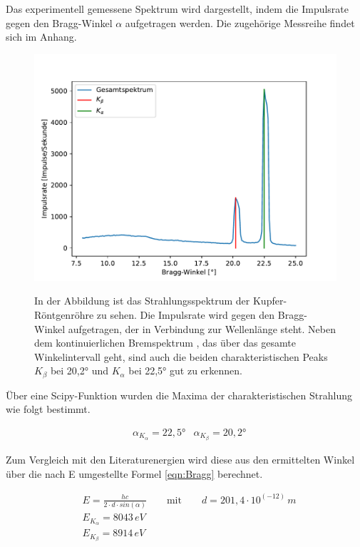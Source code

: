 \documentclass[titlepage = firstcover]{scrartcl}
\begin{document}
        \noindent
        Das experimentell gemessene Spektrum wird dargestellt, indem die Impulsrate gegen den Bragg-Winkel $\alpha$ aufgetragen werden. Die zugehörige 
        Messreihe findet sich im Anhang.
        
        \FloatBarrier
        \begin{figure}[h]
            \centering
            \caption{In der Abbildung ist das Strahlungsspektrum der Kupfer-Röntgenröhre zu sehen. Die Impulsrate wird gegen den Bragg-Winkel aufgetragen, der in Verbindung zur Wellenlänge steht. Neben dem kontinuierlichen Bremspektrum , das über das gesamte Winkelintervall geht, sind auch die beiden charakteristischen Peaks $K_{\beta}$ bei 20,2° und $K_{\alpha}$ bei 22,5° gut zu erkennen.}
            \includegraphics[width = 0.9\linewidth]{Spektrum_Cu.pdf}
            \label{fig:Spektrum}
        \end{figure}
        \FloatBarrier
        \noindent
        Über eine Scipy-Funktion wurden die Maxima der charakteristischen Strahlung wie folgt bestimmt.

        \begin{align}
            &\alpha_{K_{\alpha}} = 22,5°
            &\alpha_{K_{\beta}}  = 20,2°
        \end{align}

        \noindent
        Zum Vergleich mit den Literaturenergien wird diese aus den ermittelten Winkel über die nach E umgestellte Formel \ref{eqn:Bragg} berechnet.

        \begin{align}
            &E = \frac{hc}{2 \cdot d \cdot sin(\alpha)} \qquad \text{mit} \qquad d=201,4\cdot 10^{\left(-12\right)} \, m\\
            &E_{K_{\alpha}} = 8043 \, eV \\
            &E_{K_{\beta}}  = 8914 \, eV
        \end{align}
\end{document}
